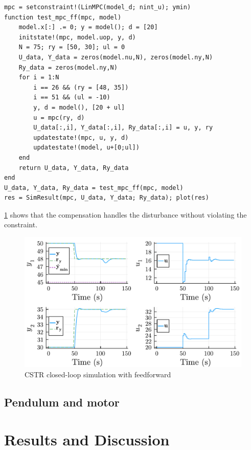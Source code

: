 \begin{verbatim}
mpc = setconstraint!(LinMPC(model_d; nint_u); ymin)
function test_mpc_ff(mpc, model)
    model.x[:] .= 0; y = model(); d = [20]
    initstate!(mpc, model.uop, y, d)
    N = 75; ry = [50, 30]; ul = 0
    U_data, Y_data = zeros(model.nu,N), zeros(model.ny,N)
    Ry_data = zeros(model.ny,N)
    for i = 1:N
        i == 26 && (ry = [48, 35])
        i == 51 && (ul = -10)
        y, d = model(), [20 + ul]
        u = mpc(ry, d)
        U_data[:,i], Y_data[:,i], Ry_data[:,i] = u, y, ry
        updatestate!(mpc, u, y, d) 
        updatestate!(model, u+[0;ul]) 
    end
    return U_data, Y_data, Ry_data
end
U_data, Y_data, Ry_data = test_mpc_ff(mpc, model)
res = SimResult(mpc, U_data, Y_data; Ry_data); plot(res)
\end{verbatim}

\cref{fig:plot2_LinMPC} shows that the compensation handles the disturbance without violating the constraint.

\begin{figure}
    \centering
    \includegraphics[width=\columnwidth]{fig/plot2_LinMPC.pdf}
    \caption{CSTR closed-loop simulation with feedforward}
    \label{fig:plot2_LinMPC}
\end{figure}

\subsection{Pendulum and motor}



\section{Results and Discussion}
\label{sec.results_simple}

